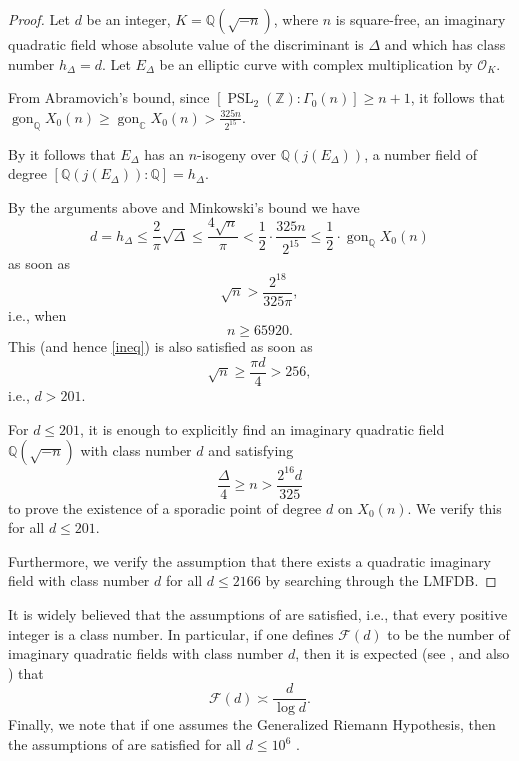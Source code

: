 \documentclass[11pt,reqno]{amsart}
\DeclareMathOperator{\PSL}{PSL}
\DeclareMathOperator{\gon}{gon}
\theoremstyle{definition}
\numberwithin{equation}{section}
\newcommand{\Q}{\mathbb{Q}}
\newcommand{\C}{\mathbb{C}}
\newcommand{\OO}{\mathcal{O}}
\begin{document}
\begin{proof}
    Let $d$ be an integer, $K=\Q(\sqrt{-n})$, where $n$ is square-free, an imaginary quadratic field whose absolute value of the discriminant is $\Delta$ and which has class number $h_\Delta=d$. Let $E_\Delta$ be an elliptic curve with complex multiplication by $\OO_K$.

 From Abramovich's bound, since $[\PSL_2(\mathbb Z) :\Gamma_0(n)]\geq n+1$, it follows that $\gon_{\Q} X_0(n)\geq \gon_{\C} X_0(n)>\frac{325n}{2^{15}}$.

By \cite[Corollary 4.2.]{Kwon} it follows that $E_\Delta$ has an $n$-isogeny over $\Q(j(E_\Delta))$, a number field of degree $[\Q(j(E_\Delta)):\Q]=h_\Delta$.

By the arguments above and Minkowski's bound we have 
\begin{equation}\label{ineq}
d=h_{\Delta}\leq  \frac{2}{\pi}\sqrt{\Delta}     
 \leq \frac{4\sqrt{n}}{\pi}<\frac{1}{2}\cdot\frac{325n}{2^{15}} \leq \frac{1}{2}\cdot \gon_\Q X_0(n)
 \end{equation}
 as soon as 
\begin{equation}\label{ineq2}
\sqrt{n}>\frac{2^{18}}{325\pi},
\end{equation}
 i.e., when 
 $$n\geq 65920.$$
This (and hence \eqref{ineq}) is also satisfied as soon as 
$$\sqrt {n}\geq \frac{\pi d}{4}>256,$$
i.e., $d>201$.
 
 
For $d\leq 201$, it is enough to explicitly find an imaginary quadratic field $\Q(\sqrt{-n})$ with class number $d$ and satisfying
$$\frac{\Delta}{4}\geq n>\frac{2^{16}d}{325}$$
to prove the existence of a sporadic point of degree $d$ on $X_0(n)$. We verify this for all $d\leq 201$.

Furthermore, we verify the assumption that there exists a quadratic imaginary field with class number $d$ for all $d\leq 2166$ by searching through the LMFDB. \end{proof}

It is widely believed that the assumptions of  are satisfied, i.e., that every positive integer is a class number. In particular, if one defines $\mathcal{F}(d)$ to be the number of imaginary quadratic fields with class number $d$, then it is expected (see \cite[(1.4)]{Soundarajan}, and also \cite {HJKMP2019}) that
$$\mathcal{F}(d)\asymp \frac{d}{\log d}.$$ Finally, we note that if one assumes the Generalized Riemann Hypothesis, then the assumptions of  are satisfied for all $d\leq 10^6$ \cite[Section 9]{HJKMP2019}.
\end{document}
